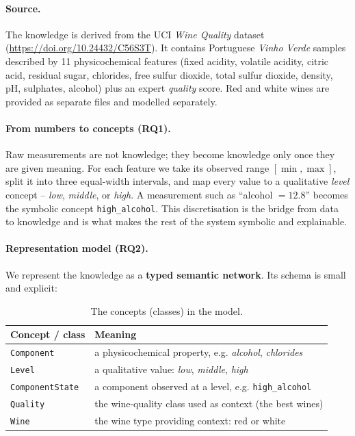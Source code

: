 \documentclass[12pt,a4paper]{article}
\begin{document}
	\paragraph{Source.} The knowledge is derived from the UCI \emph{Wine Quality}
	dataset \citep{wine_quality_186} (\url{https://doi.org/10.24432/C56S3T}). It
	contains Portuguese \emph{Vinho Verde} samples described by 11 physicochemical
	features (fixed acidity, volatile acidity, citric acid, residual sugar,
	chlorides, free sulfur dioxide, total sulfur dioxide, density, pH, sulphates,
	alcohol) plus an expert \emph{quality} score. Red and white wines are provided
	as separate files and modelled separately.

	\paragraph{From numbers to concepts (RQ1).} Raw measurements are not knowledge;
	they become knowledge only once they are given meaning. For each feature we take
	its observed range $[\min,\max]$, split it into three equal-width intervals, and
	map every value to a qualitative \emph{level} concept -- \emph{low}, \emph{middle},
	or \emph{high}. A measurement such as ``alcohol $= 12.8$'' becomes the symbolic
	concept \texttt{high\_alcohol}. This discretisation is the bridge from data to
	knowledge and is what makes the rest of the system symbolic and explainable.

	\paragraph{Representation model (RQ2).} We represent the knowledge as a
	\textbf{typed semantic network}. Its schema is small and explicit:

	\begin{table}[h]
	\centering
	\begin{tabular}{@{}lp{9.5cm}@{}}
	\toprule
	\textbf{Concept / class} & \textbf{Meaning} \\
	\midrule
	\texttt{Component}      & a physicochemical property, e.g. \emph{alcohol}, \emph{chlorides} \\
	\texttt{Level}          & a qualitative value: \emph{low}, \emph{middle}, \emph{high} \\
	\texttt{ComponentState} & a component observed at a level, e.g. \texttt{high\_alcohol} \\
	\texttt{Quality}        & the wine-quality class used as context (the best wines) \\
	\texttt{Wine}           & the wine type providing context: red or white \\
	\bottomrule
	\end{tabular}
	\caption{The concepts (classes) in the model.}
	\label{tab:classes}
	\end{table}
\end{document}

